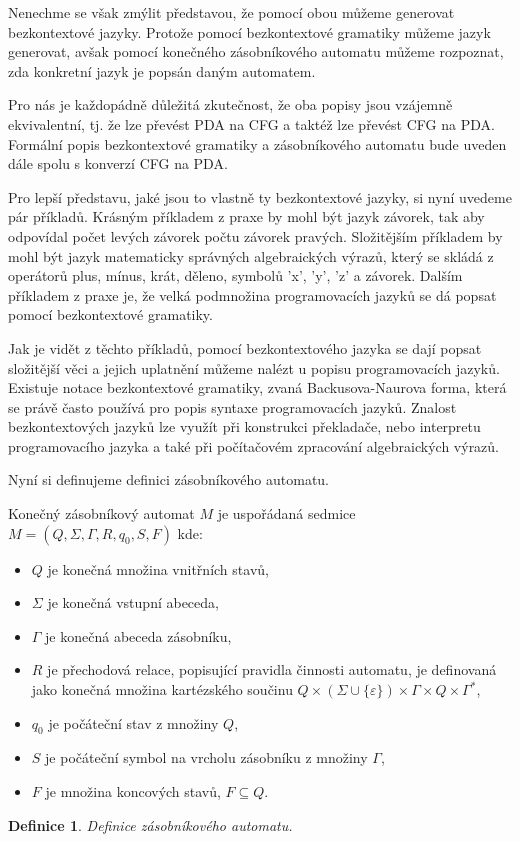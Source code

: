 Nenechme se však zmýlit představou, že pomocí obou můžeme generovat bezkontextové jazyky. Protože pomocí bezkontextové gramatiky můžeme jazyk generovat, avšak pomocí konečného zásobníkového automatu můžeme rozpoznat, zda konkretní jazyk je popsán daným automatem. 

Pro nás je každopádně důležitá zkutečnost, že oba popisy jsou vzájemně ekvivalentní, tj. že lze převést PDA na CFG a taktéž lze převést CFG na PDA. Formální popis bezkontextové gramatiky a zásobníkového automatu bude uveden dále spolu s konverzí CFG na PDA. 

Pro lepší představu, jaké jsou to vlastně ty bezkontextové jazyky, si nyní uvedeme pár příkladů. Krásným příkladem z praxe by mohl být jazyk závorek, tak aby odpovídal počet levých závorek počtu závorek pravých. Složitějším příkladem by mohl být jazyk matematicky správných algebraických výrazů, který se skládá z operátorů plus, mínus, krát, děleno, symbolů 'x', 'y', 'z' a závorek. Dalším příkladem z praxe je, že velká podmnožina programovacích jazyků se dá popsat pomocí bezkontextové gramatiky. 

Jak je vidět z těchto příkladů, pomocí bezkontextového jazyka se dají popsat složitější věci a jejich uplatnění můžeme nalézt u popisu programovacích jazyků. Existuje notace bezkontextové gramatiky, zvaná Backusova-Naurova forma, která se právě často používá pro popis syntaxe programovacích jazyků. Znalost bezkontextových jazyků lze využít při konstrukci překladače, nebo interpretu programovacího jazyka a také při počítačovém zpracování algebraických výrazů. \cite{CFL}

\newtheorem{mydef}{Definice}
\newtheorem{myAlgorithm}{Algoritmus}

Nyní si definujeme definici zásobníkového automatu. \cite{PDA}

\begin{framed}
	\begin{flushleft}Konečný zásobníkový automat \( M \) je uspořádaná sedmice \( M = (Q, \Sigma, \Gamma, R, q_0, S, F) \) kde:\end{flushleft}
	\begin{itemize}
		\item \( Q \) je konečná množina vnitřních stavů,
		\item \( \Sigma \) je konečná vstupní abeceda,
		\item \( \Gamma \) je konečná abeceda zásobníku,
		\item \( R \) je přechodová relace, popisující pravidla činnosti automatu, je definovaná jako konečná množina kartézského součinu \( Q \times (\Sigma \cup \{\varepsilon\} ) \times \Gamma \times Q \times \Gamma^* \),
		\item \( q_0 \) je počáteční stav z množiny \( Q \),
		\item \( S \) je počáteční symbol na vrcholu zásobníku z množiny \( \Gamma \),
		\item \( F \) je množina koncových stavů, \( F \subseteq Q \).
	\end{itemize}
\end{framed}
\begin{mydef}
	Definice zásobníkového automatu.
\end{mydef}

